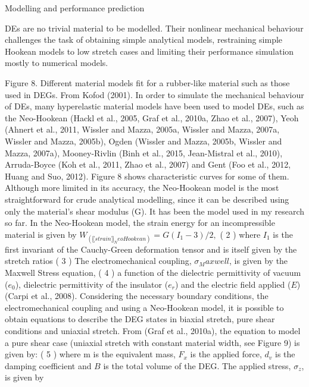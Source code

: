 Modelling and performance prediction

	DEs are no trivial material to be modelled. Their nonlinear mechanical behaviour challenges the task of obtaining simple analytical models, restraining simple Hookean models to low stretch cases and limiting their performance simulation mostly to numerical models. 
 
Figure 8. Different material models fit for a rubber-like material such as those used in DEGs. From Kofod (2001).
	In order to simulate the mechanical behaviour of DEs, many hyperelastic material models have been used to model DEs, such as the Neo-Hookean (Hackl et al., 2005, Graf et al., 2010a, Zhao et al., 2007), Yeoh (Ahnert et al., 2011, Wissler and Mazza, 2005a, Wissler and Mazza, 2007a, Wissler and Mazza, 2005b), Ogden (Wissler and Mazza, 2005b, Wissler and Mazza, 2007a), Mooney-Rivlin (Binh et al., 2015, Jean-Mistral et al., 2010), Arruda-Boyce (Koh et al., 2011, Zhao et al., 2007) and Gent (Foo et al., 2012, Huang and Suo, 2012). Figure 8 shows characteristic curves for some of them. Although more limited in its accuracy, the Neo-Hookean model is the most straightforward for crude analytical modelling, since it can be described using only the material’s shear modulus (G). It has been the model used in my research so far.
	In the Neo-Hookean model, the strain energy for an incompressible material is given by
$	W_(〖strain〗_NeoHookean )=G(I_1-3)/2,$
( 2 )
where $I_1$ is the first invariant of the Cauchy-Green deformation tensor and is itself given by the stretch ratios %
( 3 )
The electromechanical coupling, $σ_Maxwell$, is given by the Maxwell Stress equation,
( 4 )
a function of the dielectric permittivity of vacuum ($e_0$), dielectric permittivity of the insulator ($e_r$) and the electric field applied ($E$)(Carpi et al., 2008).
Considering the necessary boundary conditions, the electromechanical coupling and using a Neo-Hookean model, it is possible to obtain equations to describe the DEG states in biaxial stretch, pure shear conditions and uniaxial stretch. From (Graf et al., 2010a), the equation to model a pure shear case (uniaxial stretch with constant material width, see Figure 9) is given by:
( 5 )
where m is the equivalent mass, $F_x$ is the applied force, $d_v$ is the damping coefficient and $B$ is the total volume of the DEG. The applied stress, $σ_z$, is given by 
